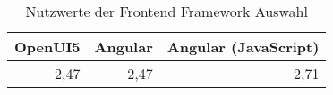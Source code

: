 \begin{table}[h]
	\caption{Nutzwerte der Frontend Framework Auswahl}
	\begin{center}
		\begin{tabular}{rrr}
			\toprule
			OpenUI5 & Angular & Angular (JavaScript) \\ \midrule
			   2,47 &    2,47 &                 2,71 \\ \bottomrule
		\end{tabular}
	\end{center}
	\label{tab:frontend-nutzwerte}
\end{table}